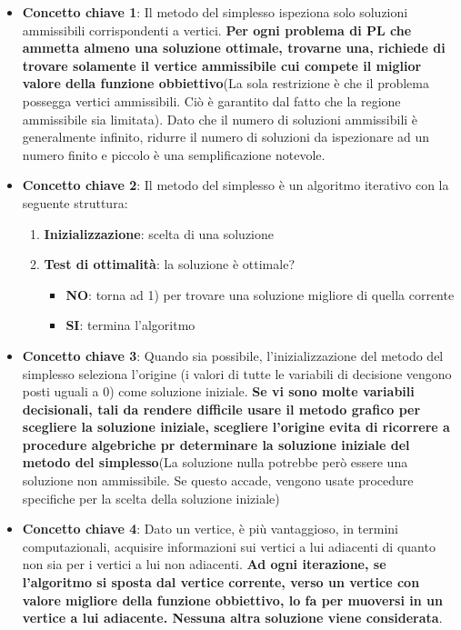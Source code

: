 \documentclass[12pt]{article}
\begin{document}
\begin{itemize}
    \item \textbf{Concetto chiave 1}: Il metodo del simplesso ispeziona solo soluzioni ammissibili corrispondenti a vertici.
    \textbf{Per ogni problema di PL che ammetta almeno una soluzione ottimale, trovarne una, richiede di trovare solamente il vertice ammissibile cui compete il miglior valore della funzione obbiettivo}(La sola restrizione è che il problema possegga vertici ammissibili. Ciò è garantito dal fatto che la regione ammissibile sia limitata).
    Dato che il numero di soluzioni ammissibili è generalmente infinito, ridurre il numero di soluzioni da ispezionare ad un numero finito e piccolo è una semplificazione notevole.
    \item \textbf{Concetto chiave 2}: Il metodo del simplesso è un algoritmo iterativo con la seguente struttura:
    \begin{enumerate}
        \item \textbf{Inizializzazione}: scelta di una soluzione
        \item \textbf{Test di ottimalità}: la soluzione è ottimale?
        \begin{itemize}
            \item \textbf{NO}: torna ad 1) per trovare una soluzione migliore di quella corrente
            \item \textbf{SI}: termina l'algoritmo
        \end{itemize}
    \end{enumerate}
    \item \textbf{Concetto chiave 3}: Quando sia possibile, l'inizializzazione del metodo del simplesso seleziona l'origine (i valori di tutte le variabili di decisione vengono posti uguali a 0) come soluzione iniziale.
    \textbf{Se vi sono molte variabili decisionali, tali da rendere difficile usare il metodo grafico per scegliere la soluzione iniziale, scegliere l'origine evita di ricorrere a procedure algebriche pr determinare la soluzione iniziale del metodo del simplesso}(La soluzione nulla potrebbe però essere una soluzione non ammissibile. Se questo accade, vengono usate procedure specifiche per la scelta della soluzione iniziale)
    \item \textbf{Concetto chiave 4}: Dato un vertice, è più vantaggioso, in termini computazionali, acquisire informazioni sui vertici a lui adiacenti di quanto non sia per i vertici a lui non adiacenti. \textbf{Ad ogni iterazione, se l'algoritmo si sposta dal vertice corrente, verso un vertice con valore migliore della funzione obbiettivo, lo fa per muoversi in un vertice a lui adiacente. Nessuna altra soluzione viene considerata}.

\end{itemize}
\end{document}
